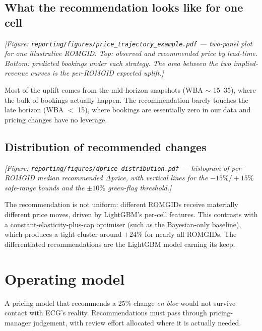 \documentclass[11pt,a4paper]{article}
\begin{document}
\subsection{What the recommendation looks like for one cell}

\begin{center}
  \emph{[Figure: \texttt{reporting/figures/price\_trajectory\_example.pdf} --- two-panel plot for one illustrative ROMGID. Top: observed and recommended price by lead-time. Bottom: predicted bookings under each strategy. The area between the two implied-revenue curves is the per-ROMGID expected uplift.]}
\end{center}

\noindent Most of the uplift comes from the mid-horizon snapshots (WBA $\sim$ 15--35), where the bulk of bookings actually happen. The recommendation barely touches the late horizon (WBA $<$ 15), where bookings are essentially zero in our data and pricing changes have no leverage.

\subsection{Distribution of recommended changes}

\begin{center}
  \emph{[Figure: \texttt{reporting/figures/dprice\_distribution.pdf} --- histogram of per-ROMGID median recommended Δprice, with vertical lines for the $-15\%/+15\%$ safe-range bounds and the $\pm 10\%$ green-flag threshold.]}
\end{center}

\noindent The recommendation is not uniform: different ROMGIDs receive materially different price moves, driven by LightGBM's per-cell features. This contrasts with a constant-elasticity-plus-cap optimiser (such as the Bayesian-only baseline), which produces a tight cluster around $+24\%$ for nearly all ROMGIDs. The differentiated recommendations are the LightGBM model earning its keep.

\section{Operating model}

A pricing model that recommends a 25\% change \emph{en bloc} would not survive contact with ECG's reality. Recommendations must pass through pricing-manager judgement, with review effort allocated where it is actually needed.
\end{document}
